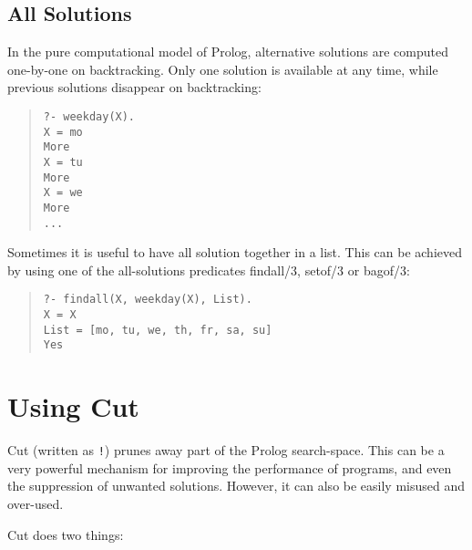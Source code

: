 

\subsection{All Solutions}
\label{all-solutions}

In the pure computational model of Prolog, alternative solutions are
computed one-by-one on backtracking. Only one solution is available
at any time, while previous solutions disappear on backtracking:
\begin{quote}\begin{verbatim}
?- weekday(X).
X = mo
More
X = tu
More
X = we
More
...
\end{verbatim}\end{quote}
Sometimes it is useful to have all solution together in a list.
This can be achieved by using one of the all-solutions predicates
findall/3, setof/3 or bagof/3:
\begin{quote}\begin{verbatim}
?- findall(X, weekday(X), List).
X = X
List = [mo, tu, we, th, fr, sa, su]
Yes
\end{verbatim}\end{quote}


\section{Using Cut}
\label{cut}
Cut (written as \verb'!') prunes away part of the Prolog search-space. This
can be a very powerful mechanism for improving the performance of programs,
and even the suppression of unwanted solutions. However, it can also be
easily misused and over-used. 

Cut does two things:

